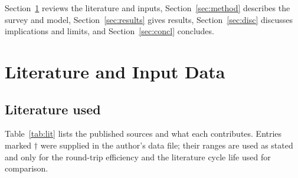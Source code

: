 \documentclass[11pt,a4paper]{article}
\begin{document}
Section~\ref{sec:data} reviews the literature and inputs, Section~\ref{sec:method} describes the survey and model, Section~\ref{sec:results} gives results, Section~\ref{sec:disc} discusses implications and limits, and Section~\ref{sec:concl} concludes.

\section{Literature and Input Data}
\label{sec:data}
\subsection{Literature used}
Table~\ref{tab:lit} lists the published sources and what each contributes. Entries marked $\dagger$ were supplied in the author's data file; their ranges are used as stated and only for the round-trip efficiency and the literature cycle life used for comparison.
\end{document}
